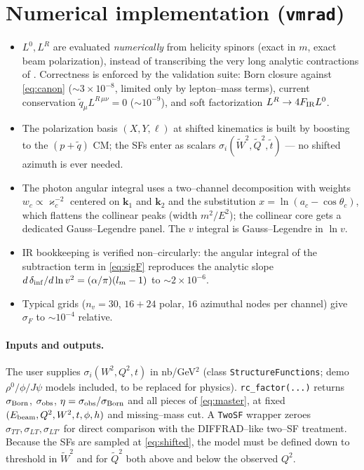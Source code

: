 \documentclass[11pt]{article}
\begin{document}
\section{Numerical implementation (\texttt{vmrad})}

\begin{itemize}
\item $L^0,L^R$ are evaluated \emph{numerically} from helicity spinors
(exact in $m$, exact beam polarization), instead of transcribing the very
long analytic contractions of \cite{exclurad}. Correctness is enforced by
the validation suite: Born closure against \eqref{eq:canon} ($\sim3\times
10^{-8}$, limited only by lepton--mass terms), current conservation
$\tilde q_\mu L^{R\,\mu\nu}=0$ ($\sim10^{-9}$), and soft factorization
$L^R\to4F_{\rm IR}L^0$.
\item The polarization basis $(X,Y,\ell)$ at shifted kinematics is built by
boosting to the $(p+\tilde q)$ CM; the SFs enter as scalars
$\sigma_i(\tilde W^2,\tilde Q^2,\tilde t)$ --- no shifted azimuth is ever
needed.
\item The photon angular integral uses a two--channel decomposition with
weights $w_c\propto\varkappa_c^{-2}$ centered on $\bm k_1$ and $\bm k_2$ and
the substitution $x=\ln(a_c-\cos\theta_c)$, which flattens the collinear
peaks (width $m^2/E^2$); the collinear core gets a dedicated
Gauss--Legendre panel. The $v$ integral is Gauss--Legendre in $\ln v$.
\item IR bookkeeping is verified non--circularly: the angular integral of
the subtraction term in \eqref{eq:sigF} reproduces the analytic slope
$d\,\delta_{\rm inf}/d\ln v^2=(\alpha/\pi)(l_m-1)$ to $\sim2\times10^{-6}$.
\item Typical grids ($n_v=30$, $16{+}24$ polar, $16$ azimuthal nodes per
channel) give $\sigma_F$ to $\sim10^{-4}$ relative.
\end{itemize}

\paragraph{Inputs and outputs.}
The user supplies $\sigma_i(W^2,Q^2,t)$ in nb/GeV$^2$ (class
\texttt{StructureFunctions}; demo $\rho^0/\phi/J\psi$ models included, to be
replaced for physics). \texttt{rc\_factor(...)} returns $\sigma_{\rm Born}$,
$\sigma_{\rm obs}$, $\eta=\sigma_{\rm obs}/\sigma_{\rm Born}$ and all pieces
of \eqref{eq:master}, at fixed $(E_{\rm beam},Q^2,W^2,t,\phi,h)$ and
missing--mass cut. A \texttt{TwoSF} wrapper zeroes
$\sigma_{TT},\sigma_{LT},\sigma_{LT'}$ for direct comparison with the
DIFFRAD--like two--SF treatment. Because the SFs are sampled at
\eqref{eq:shifted}, the model must be defined down to threshold in
$\tilde W^2$ and for $\tilde Q^2$ both above and below the observed $Q^2$.
\end{document}

